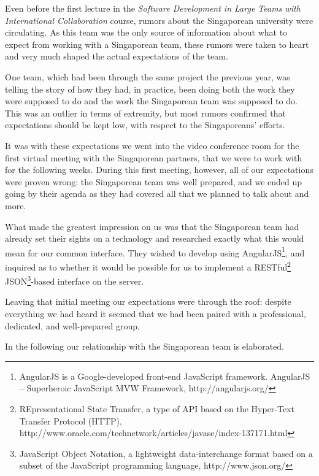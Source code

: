 Even before the first lecture in the \emph{Software
Development in Large Teams with International Collaboration} course, rumors about
the Singaporean university were circulating. As this team was the only source of
information about what to expect from working with a Singaporean team, these rumors
were taken to heart and very much shaped the actual expectations of the team.

One team, which had been through the same project the previous year, was telling
the story of how they had, in
practice, been doing both the work they were supposed to do and the work the
Singaporean team was supposed to do. This was an outlier in terms of extremity,
but most rumors confirmed that expectations should be kept low, with respect to
the Singaporeans' efforts.

It was with these expectations we went into the video conference room for the
first virtual meeting with the Singaporean partners, that we were to work with
for the following weeks. During this first meeting, however, all of our
expectations were proven wrong: the Singaporean team was well prepared, and we
ended up going by their agenda as they had covered all that we planned to talk
about and more.

What made the greatest impression on us was that the Singaporean team had
already set their sights on a technology and researched exactly what this would
mean for our common interface. They wished to develop using
AngularJS\footnote{AngularJS is a Google-developed front-end JavaScript
framework. AngularJS – Superheroic JavaScript MVW Framework,
http://angularjs.org/}, and inquired as to whether it would be possible for us
to implement a RESTful\footnote{REpresentational State Transfer, a type of API
based on the Hyper-Text Transfer Protocol (HTTP),
http://www.oracle.com/technetwork/articles/javase/index-137171.html}
JSON\footnote{ JavaScript Object Notation, a lightweight data-interchange format
based on a subset of the JavaScript programming language,
http://www.json.org/}-based interface on the server.

Leaving that initial meeting our expectations were through the roof: despite
everything we had heard it seemed that we had been paired with a professional,
dedicated, and well-prepared group.

In the following our relationship with the Singaporean team is elaborated.